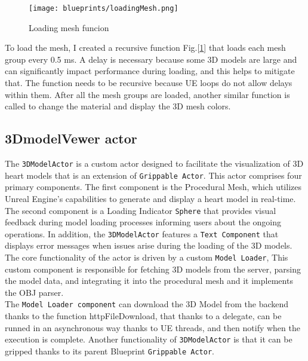 

\begin{figure}[ht]
    \centering
    \texttt{[image: blueprints/loadingMesh.png]}
    \caption{Loading mesh funcion}
    \label{fig:loadingMesh}
\end{figure}
\noindent
To load the mesh, I created a recursive function Fig.[\ref{fig:loadingMesh}] that loads each mesh group every 0.5 ms. A delay is necessary because some 3D models are large and can significantly impact performance during loading, and this helps to mitigate that. The function needs to be recursive because \ac{UE} loops do not allow delays within them.
After all the mesh groups are loaded, another similar function is called to change the material and display the 3D mesh colors.
\subsection{3DmodelVewer actor}
\noindent
The \texttt{3DModelActor} is a custom actor designed to facilitate the visualization of 3D heart models that is an extension of \texttt{Grippable Actor}. This actor comprises four primary components. The first component is the Procedural Mesh, which utilizes Unreal Engine's capabilities to generate and display a heart model in real-time. 
The second component is a Loading Indicator \texttt{Sphere} that provides visual feedback during model loading processes informing users about the ongoing operations. In addition, the \texttt{3DModelActor} features a \texttt{Text Component} that displays error messages when issues arise during the loading of the 3D models.\\
The core functionality of the actor is driven by a custom \texttt{Model Loader}, This custom component is responsible for fetching 3D models from the server, parsing the model data, and integrating it into the procedural mesh and it implements the OBJ parser.\\
The \texttt{Model Loader component} can download the 3D Model from the backend thanks to the function httpFileDownload, that thanks to a delegate, can be runned in an asynchronous way thanks to \ac{UE} threads, and then notify when the execution is complete.
Another functionality of \texttt{3DModelActor} is that it can be gripped thanks to its parent Blueprint \texttt{Grippable Actor}.



